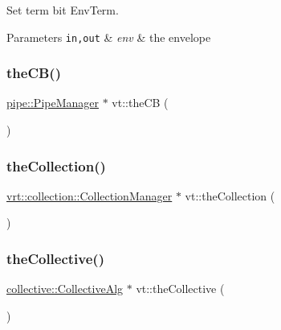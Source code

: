 Set term bit {\ttfamily Env\+Term}. 


\begin{DoxyParams}[1]{Parameters}
\mbox{\tt in,out}  & {\em env} & the envelope \\
\hline
\end{DoxyParams}
\mbox{\label{namespacevt_a673b109e94c7bca58313504c83e1da94}} 
\subsubsection{\texorpdfstring{the\+C\+B()}{theCB()}}
{\footnotesize\ttfamily \hyperlink{structvt_1_1pipe_1_1_pipe_manager}{pipe\+::\+Pipe\+Manager} $\ast$ vt\+::the\+CB (\begin{DoxyParamCaption}{ }\end{DoxyParamCaption})}

\mbox{\label{namespacevt_a1c45ce63bfd2c327ff7d76a319a371d8}} 
\subsubsection{\texorpdfstring{the\+Collection()}{theCollection()}}
{\footnotesize\ttfamily \hyperlink{structvt_1_1vrt_1_1collection_1_1_collection_manager}{vrt\+::collection\+::\+Collection\+Manager} $\ast$ vt\+::the\+Collection (\begin{DoxyParamCaption}{ }\end{DoxyParamCaption})}

\mbox{\label{namespacevt_aa8e0c0ab253e7ad1acd5d09e36fea769}} 
\subsubsection{\texorpdfstring{the\+Collective()}{theCollective()}}
{\footnotesize\ttfamily \hyperlink{structvt_1_1collective_1_1_collective_alg}{collective\+::\+Collective\+Alg} $\ast$ vt\+::the\+Collective (\begin{DoxyParamCaption}{ }\end{DoxyParamCaption})}

\mbox{\label{namespacevt_aa17c6eae35e7e41a8b11d4047b7c0839}} 
